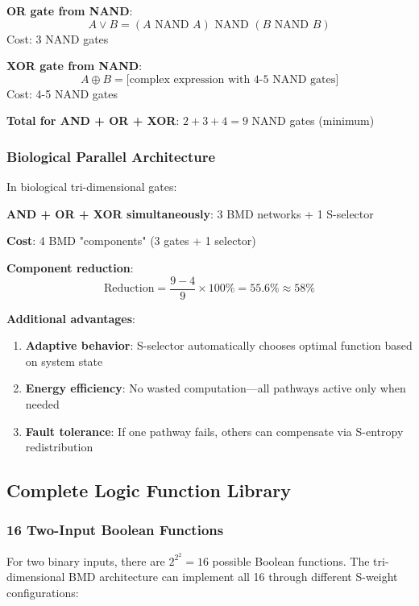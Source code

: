 \documentclass[11pt,a4paper]{article}
\begin{document}
\textbf{OR gate from NAND}:
\begin{equation}
A \lor B = (A \text{ NAND } A) \text{ NAND } (B \text{ NAND } B)
\end{equation}
Cost: 3 NAND gates

\textbf{XOR gate from NAND}:
\begin{equation}
A \oplus B = \text{[complex expression with 4-5 NAND gates]}
\end{equation}
Cost: 4-5 NAND gates

\textbf{Total for AND + OR + XOR}: $2 + 3 + 4 = 9$ NAND gates (minimum)

\subsubsection{Biological Parallel Architecture}

In biological tri-dimensional gates:

\textbf{AND + OR + XOR simultaneously}: 3 BMD networks + 1 S-selector

\textbf{Cost}: 4 BMD "components" (3 gates + 1 selector)

\textbf{Component reduction}:
\begin{equation}
\text{Reduction} = \frac{9 - 4}{9} \times 100\% = 55.6\% \approx 58\%
\end{equation}

\textbf{Additional advantages}:
\begin{enumerate}
\item \textbf{Adaptive behavior}: S-selector automatically chooses optimal function based on system state
\item \textbf{Energy efficiency}: No wasted computation—all pathways active only when needed
\item \textbf{Fault tolerance}: If one pathway fails, others can compensate via S-entropy redistribution
\end{enumerate}

\subsection{Complete Logic Function Library}

\subsubsection{16 Two-Input Boolean Functions}

For two binary inputs, there are $2^{2^2} = 16$ possible Boolean functions. The tri-dimensional BMD architecture can implement all 16 through different S-weight configurations:
\end{document}
